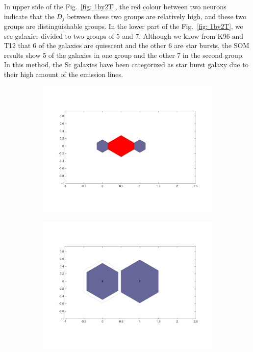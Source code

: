         
            In upper side of the Fig.~\ref{fig: 1by2T}, the red colour between two neurons indicate that the $D_j$ between these two groups are relatively high, and these two groups are distinguishable groups.
            In the lower part of the Fig.~\ref{fig: 1by2T}, we see galaxies divided to two groups of 5 and 7.
            Although we know from K96 and T12 that 6 of the galaxies are quiescent and the other 6 are star bursts, the SOM results show 5 of the galaxies in one group and the other 7 in the second group.
            In this method, the Sc galaxies have been categorized as star burst galaxy due to their high amount of the emission lines.
        
            \begin{figure}
                \begin{subfigure}[b]{0.5\textwidth}
                    \centering
                    \includegraphics[width=\textwidth]{../images/1d/dist_1_by_2.png}
                \end{subfigure}
                \hfill
                \begin{subfigure}[b]{0.5\textwidth}
                     \includegraphics[width=\textwidth]{../images/1d/hit_t_1_by_2.png}

\end{subfigure}
\end{figure}

